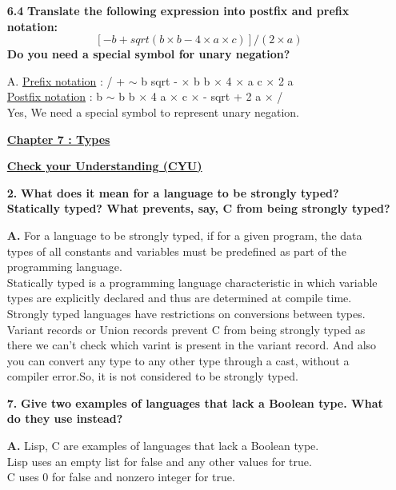 \documentclass[letterpaper]{article}
\begin{document}
\begin{large}
\begin{flushleft}
\begin{enumerate}
\item[\textbf{6.4}]
\textbf{Translate the following expression into postfix and prefix notation:
$$[-b + sqrt(b \times b - 4 \times a \times c)]/(2 \times a)$$
Do you need a special symbol for unary negation?}
\item[A.]
\underline{Prefix notation} : / + $\sim$ b sqrt - $\times$ b b $\times$ 4 $\times$ a c $\times$ 2 a\\
\underline{Postfix notation} : b $\sim$ b b $\times$ 4 a $\times$ c $\times$ - sqrt + 2 a $\times$ /\\
Yes, We need a special symbol to represent unary negation.\\[0.4in]

\begin{center}
\underline{\textbf{Chapter 7 : Types}}\\[0.2in] 
\end{center}
\textbf{\underline{Check your Understanding (CYU) }}\\[0.2in]

\item[\textbf{2.}]
\textbf{What does it mean for a language to be strongly typed? Statically typed? What prevents, say, C from being strongly typed?}
\item[\textbf{A.}]
For a language to be strongly typed, if for a given program, the data types of all constants and variables must be predefined as part of the programming language.\\
Statically typed is a programming language characteristic in which variable types are explicitly declared and thus are determined at compile time.\\
Strongly typed languages have restrictions on conversions between types. Variant records or Union records prevent C from being strongly typed as there we can't check which varint is present in the variant record. And also you can convert any type to any other type through a cast, without a compiler error.So, it is not considered to be strongly typed.\\[0.2in]

\item[\textbf{7.}]
\textbf{Give two examples of languages that lack a Boolean type. What do they use instead?
}\item[\textbf{A.}]
Lisp, C are examples of languages that lack a Boolean type.\\
Lisp uses an empty list for false and any other values for true.\\
C uses 0 for false and nonzero integer for true.\\[0.2in]


\end{enumerate}
\end{flushleft}
\end{large}
\end{document}

